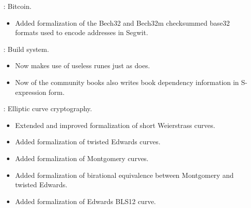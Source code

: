 \begin{frame}

\implibtitle

:
Bitcoin.
\begin{itemize}
\item Added formalization of the Bech32 and Bech32m checksummed base32 formats
      used to encode addresses in Segwit.
\end{itemize}

\end{frame}


\begin{frame}

\implibtitle

:
Build system.
\begin{itemize}
\item Now  makes use of useless runes just as  does.
\item Now  of the community books also writes book dependency
      information in S-expression form.
\end{itemize}

\end{frame}


\begin{frame}

\implibtitle

:
Elliptic curve cryptography.
\begin{itemize}
\item Extended and improved formalization of short Weierstrass curves.
\item Added formalization of twisted Edwards curves.
\item Added formalization of Montgomery curves.
\item Added formalization of birational equivalence between
      Montgomery and twisted Edwards.
\item Added formalization of Edwards BLS12 curve.
\end{itemize}

\end{frame}


